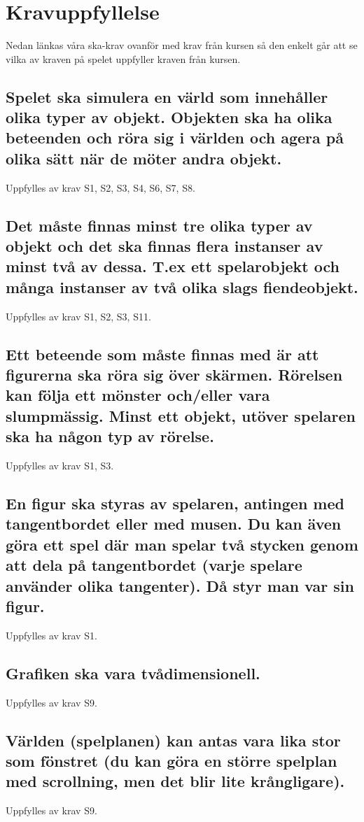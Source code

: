 \documentclass{TDP005mall}
\begin{document}
  \section{Kravuppfyllelse}
  Nedan länkas våra ska-krav ovanför med krav från kursen så den enkelt går att se vilka av kraven på spelet uppfyller kraven från kursen.

  \subsection{Spelet ska simulera en värld som innehåller olika typer av objekt. Objekten ska ha olika beteenden och röra sig i världen och agera på olika sätt när de möter andra objekt.}
  Uppfylles av krav S1, S2, S3, S4, S6, S7, S8.
  \subsection{Det måste finnas minst tre olika typer av objekt och det ska finnas flera instanser av minst två av dessa. T.ex ett spelarobjekt och många instanser av två olika slags fiendeobjekt.}
  Uppfylles av krav S1, S2, S3, S11.
  \subsection{Ett beteende som måste finnas med är att figurerna ska röra sig över skärmen. Rörelsen kan följa ett mönster och/eller vara slumpmässig. Minst ett objekt, utöver spelaren ska ha någon typ av rörelse.}
  Uppfylles av krav S1, S3.
  \subsection{En figur ska styras av spelaren, antingen med tangentbordet eller med musen. Du kan även göra ett spel där man spelar två stycken genom att dela på tangentbordet (varje spelare använder olika tangenter). Då styr man var sin figur.}
  Uppfylles av krav S1.
  \subsection{Grafiken ska vara tvådimensionell.}
  Uppfylles av krav S9.
  \subsection{Världen (spelplanen) kan antas vara lika stor som fönstret (du kan göra en större spelplan med scrollning, men det blir lite krångligare).}
  Uppfylles av krav S9.
\end{document}
